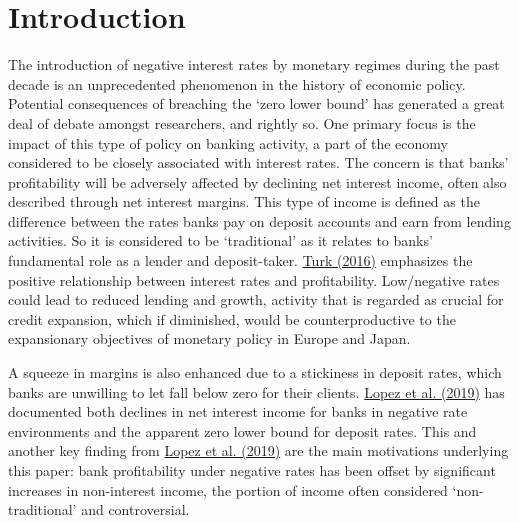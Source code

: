 \documentclass[10pt]{article} %
\begin{document}
\thispagestyle{empty}
\tableofcontents
\vspace{3.5em}
\thispagestyle{empty}
\newpage

\hypersetup{
    colorlinks=true,
    linkcolor=MidnightBlue, %
    filecolor=magenta,      %
    urlcolor=Purple,        %
    citecolor=MidnightBlue, %
}

\noindent 
\normalsize

\section{Introduction} 
The introduction of negative interest rates by monetary regimes during the past decade is an unprecedented phenomenon in the history of economic policy. Potential consequences of breaching the `zero lower bound' has generated a great deal of debate amongst researchers, and rightly so. One primary focus is the impact of this type of policy on banking activity, a part of the economy considered to be closely associated with interest rates. The concern is that banks' profitability will be adversely affected by declining net interest income, often also described through net interest margins. This type of income is defined as the difference between the rates banks pay on deposit accounts and earn from lending activities. So it is considered to be `traditional' as it relates to banks' fundamental role as a lender and deposit-taker. \hyperlink{Turk}{Turk (2016)} emphasizes the positive relationship between interest rates and profitability. Low/negative rates could lead to reduced lending and growth, activity that is regarded as crucial for credit expansion, which if diminished, would be counterproductive to the expansionary objectives of monetary policy in Europe and Japan.

A squeeze in margins is also enhanced due to a stickiness in deposit rates, which banks are unwilling to let fall below zero for their clients. \hyperlink{Lopez}{Lopez et al. (2019)} has documented both declines in net interest income for banks in negative rate environments and the apparent zero lower bound for deposit rates. This and another key finding from \hyperlink{Lopez}{Lopez et al. (2019)} are the main motivations underlying this paper: bank profitability under negative rates has been offset by significant increases in non-interest income, the portion of income often considered `non-traditional' and controversial. 
\end{document}
